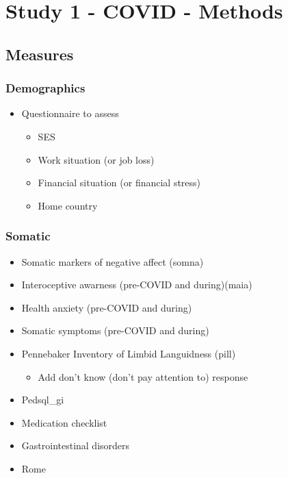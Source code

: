 \documentclass[]{book}
\providecommand{\tightlist}{%
  \setlength{\itemsep}{0pt}\setlength{\parskip}{0pt}}
\begin{document}
\hypertarget{study-1---covid---methods}{%
\chapter{Study 1 - COVID - Methods}\label{study-1---covid---methods}}

\hypertarget{measures}{%
\section{Measures}\label{measures}}

\hypertarget{demographics}{%
\subsection{Demographics}\label{demographics}}

\begin{itemize}
\tightlist
\item
  Questionnaire to assess

  \begin{itemize}
  \tightlist
  \item
    SES
  \item
    Work situation (or job loss)
  \item
    Financial situation (or financial stress)
  \item
    Home country
  \end{itemize}
\end{itemize}

\hypertarget{somatic}{%
\subsection{Somatic}\label{somatic}}

\begin{itemize}
\tightlist
\item
  Somatic markers of negative affect (somna)
\item
  Interoceptive awarness (pre-COVID and during)(maia)
\item
  Health anxiety (pre-COVID and during)
\item
  Somatic symptoms (pre-COVID and during)
\item
  Pennebaker Inventory of Limbid Languidness (pill)

  \begin{itemize}
  \tightlist
  \item
    Add don't know (don't pay attention to) response
  \end{itemize}
\item
  Pedsql\_gi
\item
  Medication checklist
\item
  Gastrointestinal disorders
\item
  Rome
\end{itemize}
\end{document}
